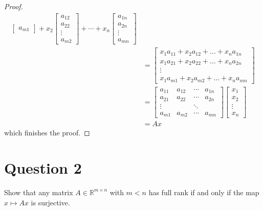 \documentclass[10pt,a4paper]{article}
\theoremstyle{definition}
\theoremstyle{definition}
\numberwithin{equation}{section}
\begin{document}
\begin{proof}
\begin{align*}
\begin{bmatrix}
a_{m1}
\end{bmatrix} + x_2 \begin{bmatrix}
a_{12}\\
a_{22}\\
\vdots\\
a_{m2}
\end{bmatrix} + \cdots + x_n \begin{bmatrix}
a_{1n}\\
a_{2n}\\
\vdots\\
a_{mn}
\end{bmatrix}\\
&= \begin{bmatrix}
x_1 a_{11} + x_2 a_{12} + \ldots + x_n a_{1n}\\
x_1 a_{21} + x_2 a_{22} + \ldots + x_n a_{2n}\\
\vdots\\
x_1 a_{m1} + x_2 a_{m2} + \ldots + x_n a_{mn}
\end{bmatrix}\\
&= \begin{bmatrix}
a_{11} & a_{12} & \cdots & a_{1n}\\
a_{21} & a_{22} & \cdots & a_{2n}\\
\vdots & & \ddots\\
a_{m1} & a_{m2} & \cdots & a_{mn}
\end{bmatrix} \begin{bmatrix}
x_1\\
x_2\\
\vdots\\
x_n
\end{bmatrix}\\
&= Ax
\end{align*}
which finishes the proof.
\end{proof}

\section*{Question 2}
Show that any matrix $A \in \mathbb{R}^{m \times n}$ with $m < n$ has full rank if and only if the map $x \mapsto Ax$ is surjective.
\end{document}
